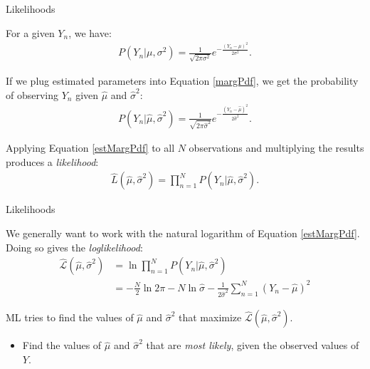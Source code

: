 \documentclass{beamer}\usepackage[]{graphicx}\usepackage[]{color}
\begin{document}
\watermarkon %

\begin{frame}{Likelihoods}
  
  For a given $Y_n$, we have:
  \begin{align}
    P \left( Y_n|\mu, \sigma^2 \right) = 
    \frac{1}{\sqrt{2 \pi \sigma^2}} 
    e^{-\frac{\left( Y_n - \mu \right)^2}{2\sigma^2}}. \label{margPdf}
  \end{align}
  
  If we plug estimated parameters into Equation \ref{margPdf}, we get the 
  probability of observing $Y_n$ given $\hat{\mu}$ and $\hat{\sigma}^2$:
  \begin{align}
    P \left( Y_n|\hat{\mu}, \hat{\sigma}^2 \right) = 
    \frac{1}{\sqrt{2 \pi \hat{\sigma}^2}} 
    e^{-\frac{\left( Y_n - \hat{\mu}\right)^2}{2\hat{\sigma}^2}}. \label{estMargPdf}
  \end{align}
  
  Applying Equation \ref{estMargPdf} to all $N$ observations and multiplying the 
  results produces a \emph{likelihood}:
  \begin{align*}
    \hat{L} \left( \hat{\mu}, \hat{\sigma}^2 \right) = 
    \prod_{n = 1}^N P \left( Y_n|\hat{\mu}, \hat{\sigma}^2 \right).
  \end{align*}
  
\end{frame}


\begin{frame}{Likelihoods}
  
  We generally want to work with the natural logarithm of Equation 
  \ref{estMargPdf}. Doing so gives the \emph{loglikelihood}:
  \begin{align*}
  \hat{\mathcal{L}} \left( \hat{\mu}, \hat{\sigma}^2 \right) &= 
    \ln \prod_{n = 1}^N P \left( Y_n|\hat{\mu}, \hat{\sigma}^2 \right)\\ 
    &= -\frac{N}{2} \ln 2\pi - N \ln \hat{\sigma} - \frac{1}{2\hat{\sigma}^2} 
    \sum_{n = 1}^N \left( Y_n - \hat{\mu} \right)^2
  \end{align*}
  
  ML tries to find the values of $\hat{\mu}$ and $\hat{\sigma}^2$ that maximize 
  $\hat{\mathcal{L}} \left( \hat{\mu}, \hat{\sigma}^2 \right)$.
  \vc
  \begin{itemize}
  \item Find the values of $\hat{\mu}$ and $\hat{\sigma}^2$ that are \emph{most 
    likely}, given the observed values of $Y$.
  \end{itemize}
  
\end{frame}
\end{document}
